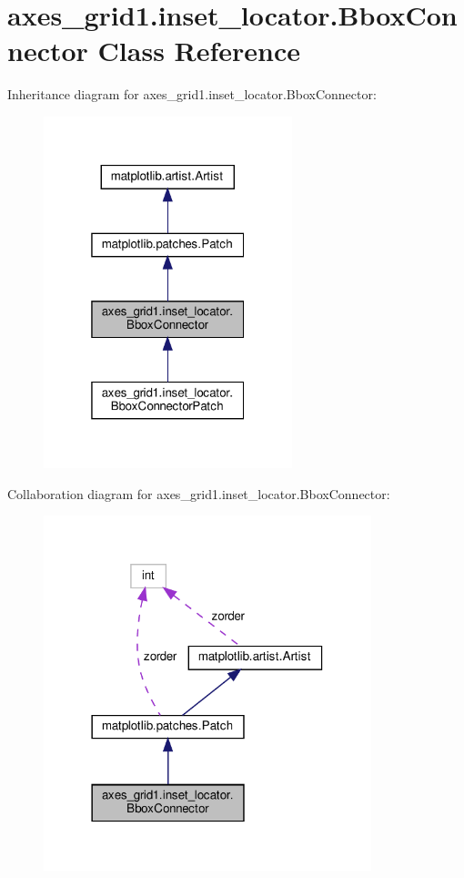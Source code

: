 \hypertarget{classaxes__grid1_1_1inset__locator_1_1BboxConnector}{}\section{axes\+\_\+grid1.\+inset\+\_\+locator.\+Bbox\+Connector Class Reference}
\label{classaxes__grid1_1_1inset__locator_1_1BboxConnector}


Inheritance diagram for axes\+\_\+grid1.\+inset\+\_\+locator.\+Bbox\+Connector\+:
\nopagebreak
\begin{figure}[H]
\begin{center}
\leavevmode
\includegraphics[width=205pt]{classaxes__grid1_1_1inset__locator_1_1BboxConnector__inherit__graph}
\end{center}
\end{figure}


Collaboration diagram for axes\+\_\+grid1.\+inset\+\_\+locator.\+Bbox\+Connector\+:
\nopagebreak
\begin{figure}[H]
\begin{center}
\leavevmode
\includegraphics[width=270pt]{classaxes__grid1_1_1inset__locator_1_1BboxConnector__coll__graph}
\end{center}
\end{figure}
